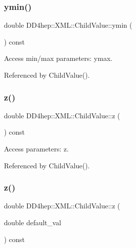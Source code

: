 \subsubsection{\texorpdfstring{ymin()}{ymin()}}
{\footnotesize\ttfamily double D\+D4hep\+::\+X\+M\+L\+::\+Child\+Value\+::ymin (\begin{DoxyParamCaption}{ }\end{DoxyParamCaption}) const}



Access min/max parameters\+: ymax. 



Referenced by Child\+Value().

\hypertarget{struct_d_d4hep_1_1_x_m_l_1_1_child_value_ab312a1587614170eda32f3d73676321a}{}\label{struct_d_d4hep_1_1_x_m_l_1_1_child_value_ab312a1587614170eda32f3d73676321a} 
\subsubsection{\texorpdfstring{z()}{z()}\hspace{0.1cm}{\footnotesize\ttfamily [1/2]}}
{\footnotesize\ttfamily double D\+D4hep\+::\+X\+M\+L\+::\+Child\+Value\+::z (\begin{DoxyParamCaption}{ }\end{DoxyParamCaption}) const}



Access parameters\+: z. 



Referenced by Child\+Value().

\hypertarget{struct_d_d4hep_1_1_x_m_l_1_1_child_value_aabfe8f00f8f802f2416eab42fb606182}{}\label{struct_d_d4hep_1_1_x_m_l_1_1_child_value_aabfe8f00f8f802f2416eab42fb606182} 
\subsubsection{\texorpdfstring{z()}{z()}\hspace{0.1cm}{\footnotesize\ttfamily [2/2]}}
{\footnotesize\ttfamily double D\+D4hep\+::\+X\+M\+L\+::\+Child\+Value\+::z (\begin{DoxyParamCaption}\item[{double}]{default\+\_\+val }\end{DoxyParamCaption}) const}




